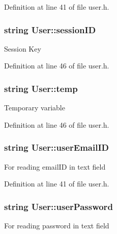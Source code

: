 Definition at line 41 of file user.\-h.

\hypertarget{classUser_ab60b88d500e9575634790a518dc584d7}{
\subsubsection[{session\-I\-D}]{\setlength{\rightskip}{0pt plus 5cm}string User\-::session\-I\-D\hspace{0.3cm}{\ttfamily [protected]}}}\label{classUser_ab60b88d500e9575634790a518dc584d7}
Session Key 

Definition at line 46 of file user.\-h.

\hypertarget{classUser_a03e84c43560a0cd720fbff832ade1d08}{
\subsubsection[{temp}]{\setlength{\rightskip}{0pt plus 5cm}string User\-::temp\hspace{0.3cm}{\ttfamily [protected]}}}\label{classUser_a03e84c43560a0cd720fbff832ade1d08}
Temporary variable 

Definition at line 46 of file user.\-h.

\hypertarget{classUser_a18c8f47943a8ebefcdaa709636a53e81}{
\subsubsection[{user\-Email\-I\-D}]{\setlength{\rightskip}{0pt plus 5cm}string User\-::user\-Email\-I\-D\hspace{0.3cm}{\ttfamily [protected]}}}\label{classUser_a18c8f47943a8ebefcdaa709636a53e81}
For reading email\-I\-D in text field 

Definition at line 41 of file user.\-h.

\hypertarget{classUser_aabe10090d6867d81bc17dd6c362196e8}{
\subsubsection[{user\-Password}]{\setlength{\rightskip}{0pt plus 5cm}string User\-::user\-Password\hspace{0.3cm}{\ttfamily [protected]}}}\label{classUser_aabe10090d6867d81bc17dd6c362196e8}
For reading password in text field 

